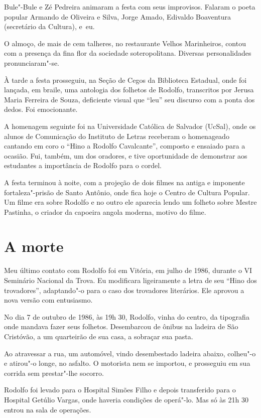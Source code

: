  Bule"-Bule e Zé Pedreira animaram a festa com seus improvisos. Falaram
o poeta popular Armando de Oliveira e Silva, Jorge Amado, Edivaldo
Boaventura (secretário da Cultura), \mbox{e eu}. 

 O almoço, de mais de cem talheres, no restaurante Velhos Marinheiros,
contou com a presença da fina flor da sociedade soteropolitana.
Diversas personalidades pronunciaram"-se. 

 À tarde a festa prosseguiu, na Seção de Cegos da Biblioteca Estadual,
onde foi lançada, em braile, uma antologia dos folhetos de Rodolfo,
transcritos por Jerusa Maria Ferreira de Souza, deficiente visual que
``leu'' seu discurso com a ponta dos dedos.
Foi emocionante. 

 A homenagem seguinte foi na Universidade Católica de Salvador (UcSal),
onde os alunos de Comunicação do Instituto de Letras receberam o
homenageado cantando em coro o ``Hino a Rodolfo
Cavalcante'', composto e ensaiado para a ocasião. Fui,
também, um dos oradores, e tive oportunidade de demonstrar aos
estudantes a importância de Rodolfo para o cordel. 

 A festa terminou à noite, com a projeção de dois filmes na antiga e
imponente fortaleza"-prisão de Santo Antônio, onde fica hoje o Centro
de Cultura Popular. Um filme era sobre Rodolfo e no outro ele aparecia
lendo um folheto sobre Mestre Pastinha, o criador da capoeira angola
moderna, motivo do filme. 


\section{A morte}

 Meu último contato com Rodolfo foi em Vitória, em julho de 1986,
durante o VI Seminário Nacional da Trova. Eu modificara ligeiramente a
letra de seu ``Hino dos trovadores'',
adaptando"-o para o caso dos trovadores literários. Ele aprovou a nova
versão com entusiasmo. 

 No dia 7 de outubro de 1986, às 19h 30, Rodolfo, vinha do centro, da
tipografia onde mandava fazer seus folhetos. Desembarcou de ônibus na
ladeira de São Cristóvão, a um quarteirão de sua casa, a sobraçar sua
pasta. 

 Ao atravessar a rua, um automóvel, vindo desembestado ladeira abaixo,
colheu"-o e atirou"-o longe, no asfalto. O motorista nem se importou,
e prosseguiu em sua corrida sem prestar"-lhe socorro. 

 Rodolfo foi levado para o Hospital Simões Filho e depois transferido
para o Hospital Getúlio Vargas, onde haveria condições de operá"-lo.
Mas só às 21h 30 entrou na sala de operações. 

